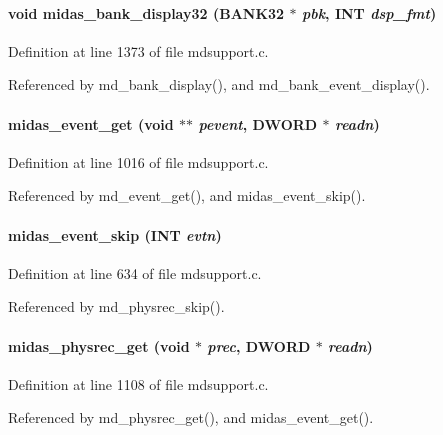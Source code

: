 \paragraph[{midas\_\-bank\_\-display32}]{\setlength{\rightskip}{0pt plus 5cm}void midas\_\-bank\_\-display32 ({\bf BANK32} $\ast$ {\em pbk}, \/  {\bf INT} {\em dsp\_\-fmt})}\hfill\label{group__mdsupportincludecode_ga3f8934034005a33d74d4ecd22b5e9866}


Definition at line 1373 of file mdsupport.c.

Referenced by md\_\-bank\_\-display(), and md\_\-bank\_\-event\_\-display().
\paragraph[{midas\_\-event\_\-get}]{ midas\_\-event\_\-get (void $\ast$$\ast$ {\em pevent}, \/  {\bf DWORD} $\ast$ {\em readn})}\hfill\label{group__mdsupportincludecode_ga71d1f12b6b396d862e81c4916a85b01f}


Definition at line 1016 of file mdsupport.c.

Referenced by md\_\-event\_\-get(), and midas\_\-event\_\-skip().
\paragraph[{midas\_\-event\_\-skip}]{ midas\_\-event\_\-skip ({\bf INT} {\em evtn})}\hfill\label{group__mdsupportincludecode_ga6aa73683c9215af058934fcc01717b49}


Definition at line 634 of file mdsupport.c.

Referenced by md\_\-physrec\_\-skip().
\paragraph[{midas\_\-physrec\_\-get}]{ midas\_\-physrec\_\-get (void $\ast$ {\em prec}, \/  {\bf DWORD} $\ast$ {\em readn})}\hfill\label{group__mdsupportincludecode_gaaa3c12fb208bf2a5fe7b2c0331ddbb2f}


Definition at line 1108 of file mdsupport.c.

Referenced by md\_\-physrec\_\-get(), and midas\_\-event\_\-get().